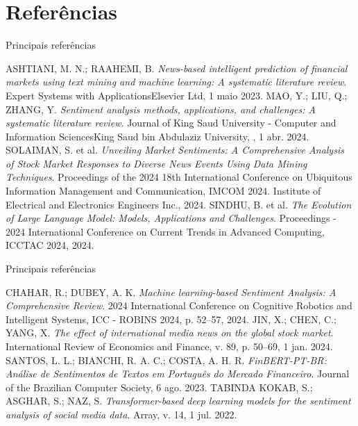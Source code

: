 \section{Referências} %

\begin{frame}{Principais referências}
    \footnotesize
    \begin{thebibliography}{99}
         ASHTIANI, M. N.; RAAHEMI, B. \textit{News-based intelligent prediction of financial markets using text mining and machine learning: A systematic literature review}. Expert Systems with ApplicationsElsevier Ltd, 1 maio 2023.
        \medskip
         MAO, Y.; LIU, Q.; ZHANG, Y. \textit{Sentiment analysis methods, applications, and challenges: A systematic literature review}. Journal of King Saud University - Computer and Information SciencesKing Saud bin Abdulaziz University, , 1 abr. 2024.
        \medskip
         SOLAIMAN, S. et al. \textit{Unveiling Market Sentiments: A Comprehensive Analysis of Stock Market Responses to Diverse News Events Using Data Mining Techniques}. Proceedings of the 2024 18th International Conference on Ubiquitous Information Management and Communication, IMCOM 2024. Institute of Electrical and Electronics Engineers Inc., 2024. 
        \medskip
         SINDHU, B. et al. \textit{The Evolution of Large Language Model: Models, Applications and Challenges}. Proceedings - 2024 International Conference on Current Trends in Advanced Computing, ICCTAC 2024, 2024. 
    \end{thebibliography}
    
\end{frame}

\begin{frame}{Principais referências}
    \footnotesize
    \begin{thebibliography}{99}
         CHAHAR, R.; DUBEY, A. K. \textit{Machine learning-based Sentiment Analysis: A Comprehensive Review}. 2024 International Conference on Cognitive Robotics and Intelligent Systems, ICC - ROBINS 2024, p. 52–57, 2024.
        \medskip
         JIN, X.; CHEN, C.; YANG, X. \textit{The effect of international media news on the global stock market}. International Review of Economics and Finance, v. 89, p. 50–69, 1 jan. 2024.
        \medskip
         SANTOS, L. L.; BIANCHI, R. A. C.; COSTA, A. H. R. \textit{FinBERT-PT-BR: Análise de Sentimentos de Textos em Português do Mercado Financeiro}. Journal of the Brazilian Computer Society, 6 ago. 2023.
        \medskip
         TABINDA KOKAB, S.; ASGHAR, S.; NAZ, S. \textit{Transformer-based deep learning models for the sentiment analysis of social media data}. Array, v. 14, 1 jul. 2022. 
    \end{thebibliography}
\end{frame}
